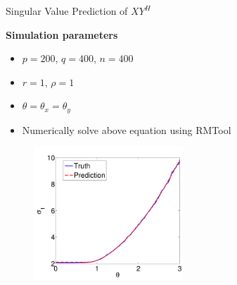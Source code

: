 \documentclass[8pt]{beamer}
\begin{document}
\begin{frame}{Singular Value Prediction of $XY^H$}

  \textbf{Simulation parameters}
  \begin{itemize}
  \item $p=200$, $q=400$, $n=400$
  \item $r=1$, $\rho = 1$
  \item $\theta=\theta_x=\theta_y$ 
  \item Numerically solve above equation using RMTool
  \end{itemize}

  \vspace{2ex}

  \begin{figure}
    \begin{center}
        \includegraphics[width=0.5\textwidth]{figures/sigma_pred.pdf}
    \end{center}
  \end{figure}

\end{frame}
\end{document}
